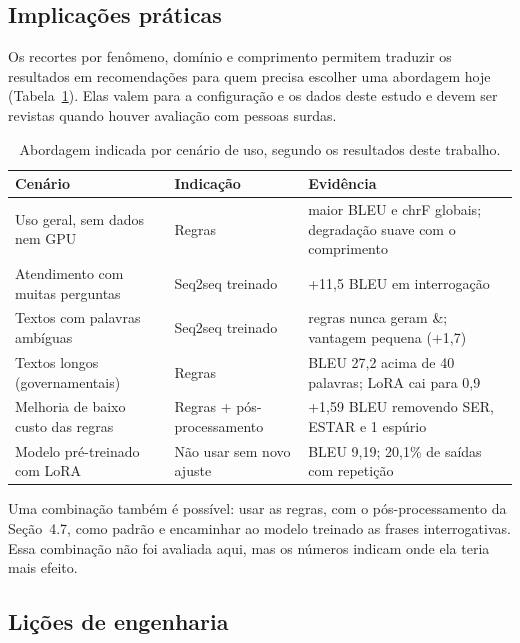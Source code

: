 \documentclass[12pt]{article}
\newcommand{\gl}[1]{\textsf{\small #1}}
\begin{document}
\subsection{Implicações práticas}

Os recortes por fenômeno, domínio e comprimento permitem traduzir os resultados em recomendações para quem precisa escolher uma abordagem hoje (Tabela~\ref{tab:recom}). Elas valem para a configuração e os dados deste estudo e devem ser revistas quando houver avaliação com pessoas surdas.

\begin{table}[!htbp]\centering\footnotesize
\caption{Abordagem indicada por cenário de uso, segundo os resultados deste trabalho.}\label{tab:recom}
\begin{tabularx}{\textwidth}{@{}XlX@{}}\toprule
Cenário & Indicação & Evidência\\\midrule
Uso geral, sem dados nem GPU & Regras & maior BLEU e chrF globais; degradação suave com o comprimento\\
Atendimento com muitas perguntas & Seq2seq treinado & +11,5 BLEU em interrogação\\
Textos com palavras ambíguas & Seq2seq treinado & regras nunca geram \gl{\&}; vantagem pequena (+1,7)\\
Textos longos (governamentais) & Regras & BLEU 27,2 acima de 40 palavras; LoRA cai para 0,9\\
Melhoria de baixo custo das regras & Regras + pós-processamento & +1,59 BLEU removendo \gl{SER}, \gl{ESTAR} e \gl{1} espúrio\\
Modelo pré-treinado com LoRA & Não usar sem novo ajuste & BLEU 9,19; 20,1\% de saídas com repetição\\\bottomrule
\end{tabularx}
\end{table}

Uma combinação também é possível: usar as regras, com o pós-processamento da Seção~4.7, como padrão e encaminhar ao modelo treinado as frases interrogativas. Essa combinação não foi avaliada aqui, mas os números indicam onde ela teria mais efeito.

\subsection{Lições de engenharia}
\end{document}
